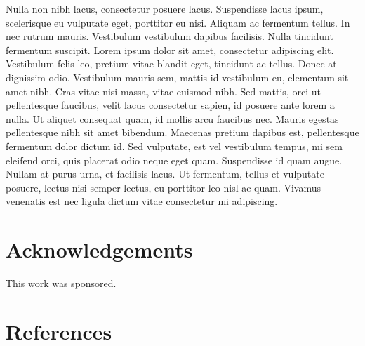 \begin{refsection}
Nulla non nibh lacus, consectetur posuere lacus. Suspendisse lacus
ipsum, scelerisque eu vulputate eget, porttitor eu nisi. Aliquam ac
fermentum tellus. In nec rutrum mauris. Vestibulum vestibulum dapibus
facilisis. Nulla tincidunt fermentum suscipit. Lorem ipsum dolor sit
amet, consectetur adipiscing elit. Vestibulum felis leo, pretium vitae
blandit eget, tincidunt ac tellus. Donec at dignissim odio. Vestibulum
mauris sem, mattis id vestibulum eu, elementum sit amet nibh. Cras
vitae nisi massa, vitae euismod nibh. Sed mattis, orci ut pellentesque
faucibus, velit lacus consectetur sapien, id posuere ante lorem a
nulla. Ut aliquet consequat quam, id mollis arcu faucibus nec. Mauris
egestas pellentesque nibh sit amet bibendum. Maecenas pretium dapibus
est, pellentesque fermentum dolor dictum id. Sed vulputate, est vel
vestibulum tempus, mi sem eleifend orci, quis placerat odio neque eget
quam. Suspendisse id quam augue. Nullam at purus urna, et facilisis
lacus. Ut fermentum, tellus et vulputate posuere, lectus nisi semper
lectus, eu porttitor leo nisl ac quam. Vivamus venenatis est nec
ligula dictum vitae consectetur mi adipiscing.

\lipsum[4-20]


\section*{Acknowledgements}
\label{sec:acknowledgements}

This work was sponsored.





\section*{References}
\pagestyle{empty}
\printbibliography[heading=none]
\end{refsection}
